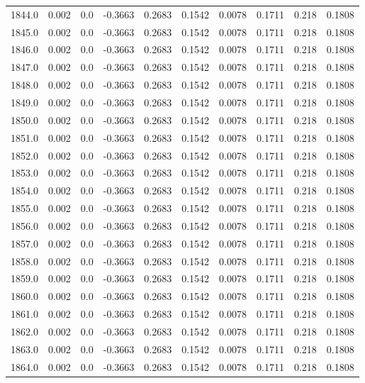 \begin{longtable}{lrrrrrrrrr}
1844.0 & 0.002 & 0.0 & -0.3663 & 0.2683 & 0.1542 & 0.0078 & 0.1711 & 0.218 & 0.1808 \\
1845.0 & 0.002 & 0.0 & -0.3663 & 0.2683 & 0.1542 & 0.0078 & 0.1711 & 0.218 & 0.1808 \\
1846.0 & 0.002 & 0.0 & -0.3663 & 0.2683 & 0.1542 & 0.0078 & 0.1711 & 0.218 & 0.1808 \\
1847.0 & 0.002 & 0.0 & -0.3663 & 0.2683 & 0.1542 & 0.0078 & 0.1711 & 0.218 & 0.1808 \\
1848.0 & 0.002 & 0.0 & -0.3663 & 0.2683 & 0.1542 & 0.0078 & 0.1711 & 0.218 & 0.1808 \\
1849.0 & 0.002 & 0.0 & -0.3663 & 0.2683 & 0.1542 & 0.0078 & 0.1711 & 0.218 & 0.1808 \\
1850.0 & 0.002 & 0.0 & -0.3663 & 0.2683 & 0.1542 & 0.0078 & 0.1711 & 0.218 & 0.1808 \\
1851.0 & 0.002 & 0.0 & -0.3663 & 0.2683 & 0.1542 & 0.0078 & 0.1711 & 0.218 & 0.1808 \\
1852.0 & 0.002 & 0.0 & -0.3663 & 0.2683 & 0.1542 & 0.0078 & 0.1711 & 0.218 & 0.1808 \\
1853.0 & 0.002 & 0.0 & -0.3663 & 0.2683 & 0.1542 & 0.0078 & 0.1711 & 0.218 & 0.1808 \\
1854.0 & 0.002 & 0.0 & -0.3663 & 0.2683 & 0.1542 & 0.0078 & 0.1711 & 0.218 & 0.1808 \\
1855.0 & 0.002 & 0.0 & -0.3663 & 0.2683 & 0.1542 & 0.0078 & 0.1711 & 0.218 & 0.1808 \\
1856.0 & 0.002 & 0.0 & -0.3663 & 0.2683 & 0.1542 & 0.0078 & 0.1711 & 0.218 & 0.1808 \\
1857.0 & 0.002 & 0.0 & -0.3663 & 0.2683 & 0.1542 & 0.0078 & 0.1711 & 0.218 & 0.1808 \\
1858.0 & 0.002 & 0.0 & -0.3663 & 0.2683 & 0.1542 & 0.0078 & 0.1711 & 0.218 & 0.1808 \\
1859.0 & 0.002 & 0.0 & -0.3663 & 0.2683 & 0.1542 & 0.0078 & 0.1711 & 0.218 & 0.1808 \\
1860.0 & 0.002 & 0.0 & -0.3663 & 0.2683 & 0.1542 & 0.0078 & 0.1711 & 0.218 & 0.1808 \\
1861.0 & 0.002 & 0.0 & -0.3663 & 0.2683 & 0.1542 & 0.0078 & 0.1711 & 0.218 & 0.1808 \\
1862.0 & 0.002 & 0.0 & -0.3663 & 0.2683 & 0.1542 & 0.0078 & 0.1711 & 0.218 & 0.1808 \\
1863.0 & 0.002 & 0.0 & -0.3663 & 0.2683 & 0.1542 & 0.0078 & 0.1711 & 0.218 & 0.1808 \\
1864.0 & 0.002 & 0.0 & -0.3663 & 0.2683 & 0.1542 & 0.0078 & 0.1711 & 0.218 & 0.1808 \\

\end{longtable}
